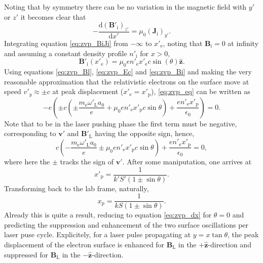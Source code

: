 Noting that by symmetry there can be no variation in the magnetic field with $y'$ or $z'$ it becomes clear that
\begin{equation}\label{eq:zvp_BiJi}
	-\frac{\mathrm{d}(\mathbf{B}'_\mathrm{i})_{z'}}{\mathrm{d} x'} = \mu_0 (\mathbf{J}_\mathrm{i})_{y'}.
\end{equation}
Integrating equation \ref{eq:zvp_BiJi} from $-\infty$ to $x'_\mathrm{e}$, noting that $\mathbf{B}_\mathrm{i} = 0$ at infinity and assuming a constant density profile $n'_\mathrm{i}$ for $x>0$,
\begin{equation}\label{eq:zvp_Bi}
	\mathbf{B}'_\mathrm{i}(x'_\mathrm{e}) = \mu_0 en'_\mathrm{e}x'_\mathrm{e}c\sin(\theta)\hat{\mathbf{z}}.
\end{equation}
Using equations \ref{eq:zvp_Bl}, \ref{eq:zvp_Ec} and \ref{eq:zvp_Bi} and making the very reasonable approximation that the relativistic electrons on the surface move at speed $v'_y \approx \pm c$ at peak displacement ($x'_\mathrm{e} = x'_\mathrm{p}$), \ref{eq:zvp_eq} can be written as
\begin{equation}
	-e\left(\pm c\left(\pm\frac{m_\mathrm{e}\omega'_\mathrm{L}a_0}{e} + \mu_0 en'_\mathrm{e} x'_\mathrm{p}c\sin\theta\right)+\frac{en'_\mathrm{e}x'_\mathrm{p}}{\epsilon_0}\right) = 0.
\end{equation}
Note that to be in the laser pushing phase the first term must be negative, corresponding to $\mathbf{v'}$ and $\mathbf{B}'_\mathrm{L}$ having the opposite sign, hence,
\begin{equation}
	 c\left(-\frac{m_\mathrm{e}\omega'_\mathrm{L}a_0}{e} \pm \mu_0 en'_\mathrm{e} x'_\mathrm{p}c\sin\theta\right)+\frac{en'_\mathrm{e}x'_\mathrm{p}}{\epsilon_0} = 0,
\end{equation}
where here the $\pm$ tracks the sign of $\mathbf{v}'$. After some maniputation, one arrives at
\begin{equation}
	x'_\mathrm{p} = \frac{1}{k'S' (1\pm \sin\theta)}.
\end{equation}
Transforming back to the lab frame, naturally,
\begin{equation}
	x_\mathrm{p} = \frac{1}{kS(1\pm \sin\theta)}.
\end{equation}
Already this is quite a result, reducing to equation \ref{eq:zvp_dx} for $\theta =0$ and predicting the suppression and enhancement of the two surface oscillations per laser puse cycle. Explicitely, for a laser pulse propagating at $y = x\tan\theta$, the peak displacement of the electron surface is enhanced for $\mathbf{B}_\mathrm{L}$ in the $+\hat{\mathbf{z}}$-direction and suppressed for $\mathbf{B}_\mathrm{L}$ in the $-\hat{\mathbf{z}}$-direction.


